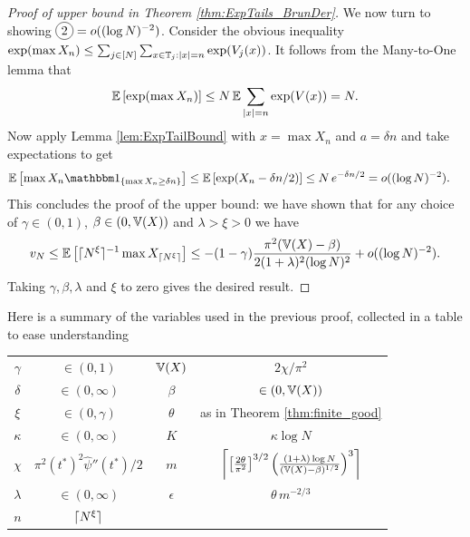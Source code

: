 \begin{proof}[Proof of upper bound in Theorem \ref{thm:ExpTails_BrunDer}]
We now turn to showing $\circled{2} = o((\log N)^{-2})$. Consider the obvious inequality $\exp(\max X_n) \leq \sum_{j \in [N]} \sum_{x \in \bb{T}_j : |x| = n} \exp(V_j(x))$. It follows from the Many-to-One lemma that 
\begin{align*}
\Ex{\exp(\max X_n)} \leq N\, \E\sum\limits_{|x| = n} \exp(V(x)) = N. 
\end{align*}
Now apply Lemma \ref{lem:ExpTailBound} with $x = \max X_n$ and $a = \delta n$ and take expectations to get 
\begin{align*}
\Ex{\max X_n \Ind_{\{\max X_n \geq \delta n \}}} &\leq \Ex{\exp(X_n - \delta n / 2)} \leq N \, e^{-\delta n / 2} = o((\log N)^{-2}).
\end{align*}
This concludes the proof of the upper bound: we have shown that for any choice of $\gamma \in (0,1)$, $\beta \in (0, \bb{V}(X))$ and $\lambda > \xi > 0$ we have
\begin{equation}\label{eqn:ExpTailResultTally}
v_N \leq \Ex{\ceil{N^\xi}^{-1} \max X_{\ceil{N^\xi}}} \leq - (1 - \gamma) \frac{\pi^2 (\bb{V}(X) - \beta)}{2 (1 + \lambda)^2(\log N)^2} + o((\log N)^{-2}). 
\end{equation}
Taking $\gamma, \beta, \lambda$ and $\xi$ to zero gives the desired result. 
\end{proof}

Here is a summary of the variables used in the previous proof, collected in a table to ease understanding
\begin{center}
\begin{tabular}{|c|c||c|c|} 
 \hline
 $\gamma$ 	& $\in (0, 1)$ 			&	$\bb{V}(X)$		& $2 \chi / \pi^2$		        \\

 $\delta$ 	& $\in (0, \infty)$ 	&  	$\beta$			& $\in (0, \bb{V}(X))$								            \\ 

 $\xi$ 		& $\in (0, \gamma)$ 	&	$\theta$	& as in Theorem \ref{thm:finite_good}			                             \\ 

 $\kappa$	& $\in (0, \infty)$		&	$K$ 				& $\kappa \log N$	                 \\

$\chi$ 			& $\pi^2 (t^*)^2 \widehat{\psi}''(t^*) / 2$ &  $m$ & $\ceil*{ \left[\frac{2 \theta}{\pi^2}\right]^{3/2} \left( \frac{(1 + \lambda) \log N}{(\bb{V}(X) - \beta)^{1/2}}\right)^3}$\\

$\lambda$	& $\in (0, \infty)$ & $\epsilon$ & $\theta\,m^{-2/3}$ \\

$n$ 		& $\ceil{N^\xi}$     & & \\

 \hline
\end{tabular}
\end{center}










